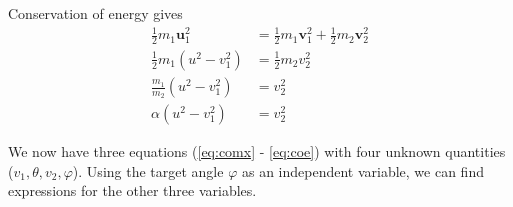 \documentclass[twoside,english]{uiofysmaster/uiofysmaster}
\begin{document}
\begin{appendices}
Conservation of energy gives
\begin{align}\label{eq:coe}
	\tfrac{1}{2} m_1 \boldsymbol{u}_1^2 &= \tfrac{1}{2} m_1 \boldsymbol{v}_1^2 + \tfrac{1}{2} m_2 \boldsymbol{v}_2^2 \nonumber\\
	\tfrac{1}{2} m_1 (u^2 - v_1^2) &= \tfrac{1}{2} m_2 v_2^2 \nonumber\\
	\frac{m_1}{m_2} (u^2 - v_1^2) &= v_2^2 \nonumber\\
	\alpha (u^2 - v_1^2) &= v_2^2
\end{align}

We now have three equations (\autoref{eq:comx} - \autoref{eq:coe}) with four unknown quantities ($v_1, \theta, v_2, \varphi$). Using the target angle $\varphi$ as an independent variable, we can find expressions for the other three variables. 


\end{appendices}
\end{document}
